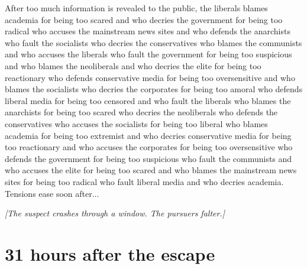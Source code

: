 \documentclass{report}
\begin{document}
After too much information is revealed to the public, the liberals blames academia for being too scared and who decries the government for being too radical who accuses the mainstream news sites and who defends the anarchists who fault the socialists who decries the conservatives who blames the communists and who accuses the liberals who fault the government for being too suspicious and who blames the neoliberals and who decries the elite for being too reactionary who defends conservative media for being too oversensitive and who blames the socialists who decries the corporates for being too amoral who defends liberal media for being too censored and who fault the liberals who blames the anarchists for being too scared who decries the neoliberals who defends the conservatives who accuses the socialists for being too liberal who blames academia for being too extremist and who decries conservative media for being too reactionary and who accuses the corporates for being too oversensitive who defends the government for being too suspicious who fault the communists and who accuses the elite for being too scared and who blames the mainstream news sites for being too radical who fault liberal media and who decries academia. Tensions ease soon after...

\textit{[The suspect crashes through a window. The pursuers falter.]}


\section*{31 \small{hours after the escape}}
\end{document}
